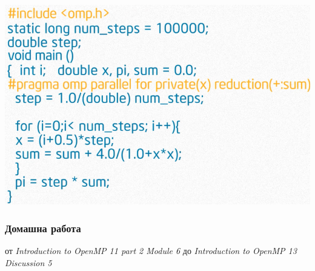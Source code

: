 \documentclass{beamer}
\begin{document}

\begin{frame}
  \includegraphics[width=\textwidth]{pi}
\end{frame}

\begin{frame}
  \frametitle{Домашна работа}
  от \textit{Introduction to OpenMP 11 part 2 Module 6} до \textit{Introduction to OpenMP 13 Discussion 5}

\end{frame}
\end{document}
